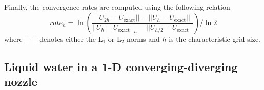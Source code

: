Finally, the convergence rates are computed using the following relation 
\begin{equation}
\label{eq:conv_rates}
rate_h = \ln \left( \frac{|| U_{2h}-U_{\text{exact}} || - || U_{h}-U_{\text{exact}} ||}{|| U_{h}-U_{\text{exact}} ||_h - || U_{h/2}-U_{\text{exact}} || } \right) / \ln 2
\end{equation}
where $|| \cdot ||$ denotes either the L$_1$ or L$_2$ norms and $h$ is the characteristic grid size.

\subsection{Liquid water in a 1-D converging-diverging nozzle} \label{sec:liquid_nozzle}

